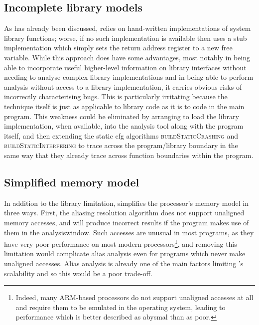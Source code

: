 \subsection{Incomplete library models}
As has already been discussed, {\implementation} relies on
hand-written {\StateMachine} implementations of system library
functions; worse, if no such implementation is available then
{\implementation} uses a stub implementation which simply sets the
return address register to a new free variable.  While this approach
does have some advantages, most notably in being able to incorporate
useful higher-level information on library interfaces without needing
to analyse complex library implementations and in being able to
perform analysis without access to a library implementation, it
carries obvious risks of incorrectly characterising bugs.  This is
particularly irritating because the {\technique} technique itself is
just as applicable to library code as it is to code in the main
program.  This weakness could be eliminated by arranging to load the
library implementation, when available, into the {\implementation}
analysis tool along with the program itself, and then extending the
static \gls{cfg} algorithms \textsc{buildStaticCrashing} and
\textsc{buildStaticInterfering} to trace across the program/library
boundary in the same way that they already trace across function
boundaries within the program.

\subsection{Simplified memory model}
In addition to the library limitation, {\implementation} simplifies
the processor's memory model in three ways.  First, the aliasing
resolution algorithm does not support unaligned memory accesses, and
will produce incorrect results if the program makes use of them in the
\gls{analysiswindow}.  Such accesses are unusual in most programs, as
they have very poor performance on most modern
processors\footnote{Indeed, many ARM-based processors do not support
  unaligned accesses at all and require them to be emulated in the
  operating system, leading to performance which is better described
  as abysmal than as poor.}, and removing this limitation would
complicate alias analysis even for programs which never make unaligned
accesses.  Alias analysis is already one of the main factors limiting
{\implementation}'s scalability and so this would be a poor trade-off.

